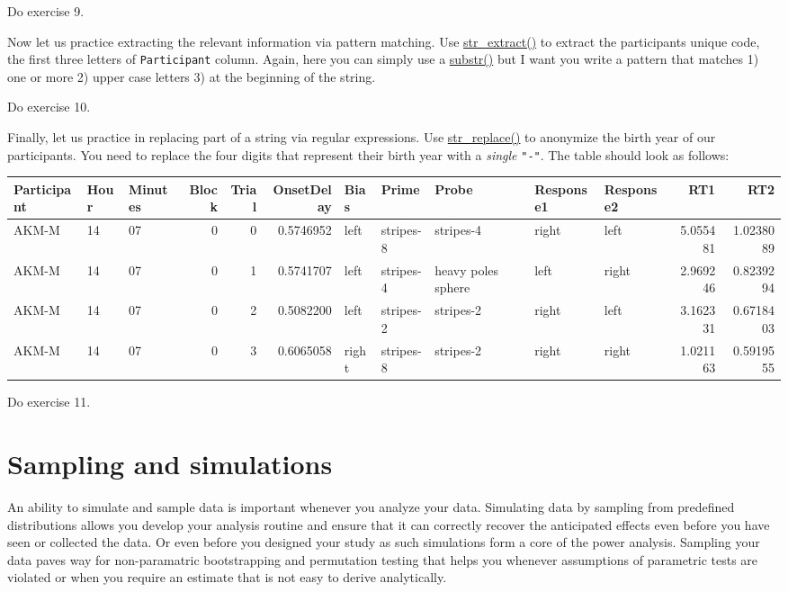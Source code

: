 \documentclass[
]{book}
\begin{document}
Do exercise 9.

Now let us practice extracting the relevant information via pattern matching. Use \href{https://stringr.tidyverse.org/reference/str_extract.html}{str\_extract()} to extract the participants unique code, the first three letters of \texttt{Participant} column. Again, here you can simply use a \href{https://stat.ethz.ch/R-manual/R-patched/library/base/html/substr.html}{substr()} but I want you write a pattern that matches 1) one or more 2) upper case letters 3) at the beginning of the string.

Do exercise 10.

Finally, let us practice in replacing part of a string via regular expressions. Use \href{https://stringr.tidyverse.org/reference/str_replace.html}{str\_replace()} to anonymize the birth year of our participants. You need to replace the four digits that represent their birth year with a \emph{single} \texttt{"-"}. The table should look as follows:

\begin{tabular}{l|l|l|r|r|r|l|l|l|l|l|r|r}
\hline
Participant & Hour & Minutes & Block & Trial & OnsetDelay & Bias & Prime & Probe & Response1 & Response2 & RT1 & RT2\\
\hline
AKM-M & 14 & 07 & 0 & 0 & 0.5746952 & left & stripes-8 & stripes-4 & right & left & 5.055481 & 1.0238089\\
\hline
AKM-M & 14 & 07 & 0 & 1 & 0.5741707 & left & stripes-4 & heavy poles sphere & left & right & 2.969246 & 0.8239294\\
\hline
AKM-M & 14 & 07 & 0 & 2 & 0.5082200 & left & stripes-2 & stripes-2 & right & left & 3.162331 & 0.6718403\\
\hline
AKM-M & 14 & 07 & 0 & 3 & 0.6065058 & right & stripes-8 & stripes-2 & right & right & 1.021163 & 0.5919555\\
\hline
\end{tabular}

Do exercise 11.

\hypertarget{sampling-and-simulations}{%
\chapter{Sampling and simulations}\label{sampling-and-simulations}}

An ability to simulate and sample data is important whenever you analyze your data. Simulating data by sampling from predefined distributions allows you develop your analysis routine and ensure that it can correctly recover the anticipated effects even before you have seen or collected the data. Or even before you designed your study as such simulations form a core of the power analysis. Sampling your data paves way for non-paramatric bootstrapping and permutation testing that helps you whenever assumptions of parametric tests are violated or when you require an estimate that is not easy to derive analytically.
\end{document}
